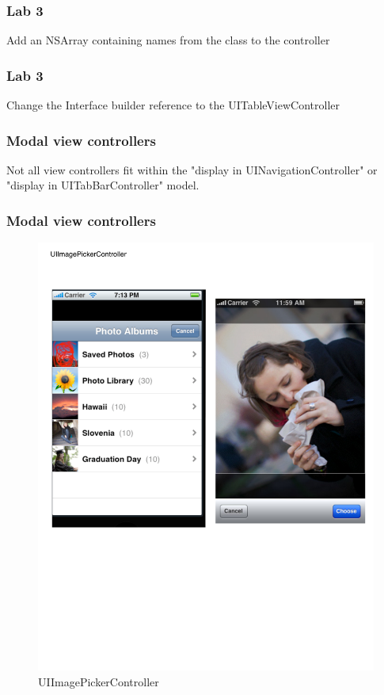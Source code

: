 \documentclass[10pt]{beamer}
\begin{document}
\begin{frame}[fragile]
  \frametitle{Lab 3}
  Add an NSArray containing names from the class to the controller

\end{frame}

\begin{frame}[fragile]
  \frametitle{Lab 3}
  Change the Interface builder reference to the UITableViewController

\end{frame}

    
\begin{frame}[fragile]
  \frametitle{Modal view controllers}
  Not all view controllers fit within the "display in UINavigationController" or "display in UITabBarController" model.

\end{frame}

\begin{frame}[fragile]
  \frametitle{Modal view controllers}
  \begin{figure}[htb]
  \begin{center}

  \includegraphics[scale=0.35]{UIViewExample6.pdf}

  \caption{UIImagePickerController}
  \end{center}
  \end{figure}

\end{frame}
\end{document}

